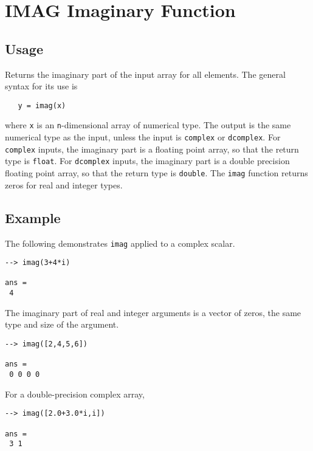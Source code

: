 \section{IMAG Imaginary Function}

\subsection{Usage}

Returns the imaginary part of the input array for all elements.  The 
general syntax for its use is
\begin{verbatim}
   y = imag(x)
\end{verbatim}
where \verb|x| is an \verb|n|-dimensional array of numerical type.  The output 
is the same numerical type as the input, unless the input is \verb|complex|
or \verb|dcomplex|.  For \verb|complex| inputs, the imaginary part is a floating
point array, so that the return type is \verb|float|.  For \verb|dcomplex|
inputs, the imaginary part is a double precision floating point array, so that
the return type is \verb|double|.  The \verb|imag| function returns zeros for 
real and integer types.
\subsection{Example}

The following demonstrates \verb|imag| applied to a complex scalar.
\begin{verbatim}
--> imag(3+4*i)

ans = 
 4 
\end{verbatim}
The imaginary part of real and integer arguments is a vector of zeros, the
same type and size of the argument.
\begin{verbatim}
--> imag([2,4,5,6])

ans = 
 0 0 0 0 
\end{verbatim}
For a double-precision complex array,
\begin{verbatim}
--> imag([2.0+3.0*i,i])

ans = 
 3 1 
\end{verbatim}
